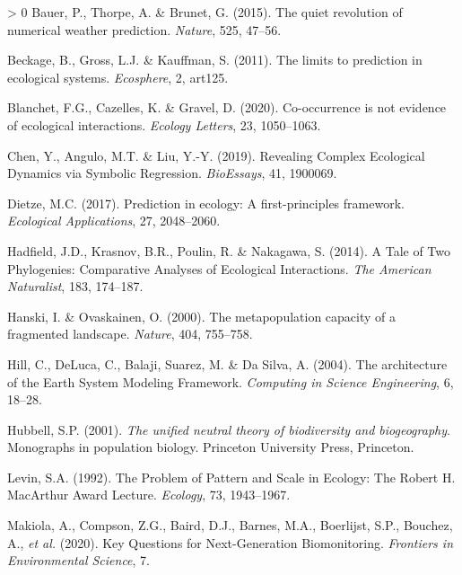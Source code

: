 \documentclass[11pt]{article}
\newlength{\cslhangindent}
\newenvironment{CSLReferences}[3] %
 {%
  \setlength{\parindent}{0pt}
  \ifodd #1 \everypar{\setlength{\hangindent}{\cslhangindent}}\ignorespaces\fi
  \ifnum #2 > 0
  \setlength{\parskip}{#2\baselineskip}
  \fi
 }%
 {}
\begin{document}
\hypertarget{refs}{}
\begin{CSLReferences}{1}{0}
\leavevmode\hypertarget{ref-Bauer2015QuiRev}{}%
Bauer, P., Thorpe, A. \& Brunet, G. (2015). The quiet revolution of
numerical weather prediction. \emph{Nature}, 525, 47--56.

\leavevmode\hypertarget{ref-Beckage2011LimPre}{}%
Beckage, B., Gross, L.J. \& Kauffman, S. (2011). The limits to
prediction in ecological systems. \emph{Ecosphere}, 2, art125.

\leavevmode\hypertarget{ref-Blanchet2020CooNot}{}%
Blanchet, F.G., Cazelles, K. \& Gravel, D. (2020). Co-occurrence is not
evidence of ecological interactions. \emph{Ecology Letters}, 23,
1050--1063.

\leavevmode\hypertarget{ref-Chen2019RevCom}{}%
Chen, Y., Angulo, M.T. \& Liu, Y.-Y. (2019). Revealing Complex
Ecological Dynamics via Symbolic Regression. \emph{BioEssays}, 41,
1900069.

\leavevmode\hypertarget{ref-Dietze2017PreEco}{}%
Dietze, M.C. (2017). Prediction in ecology: A first-principles
framework. \emph{Ecological Applications}, 27, 2048--2060.

\leavevmode\hypertarget{ref-Hadfield2014TalTwo}{}%
Hadfield, J.D., Krasnov, B.R., Poulin, R. \& Nakagawa, S. (2014). A Tale
of Two Phylogenies: Comparative Analyses of Ecological Interactions.
\emph{The American Naturalist}, 183, 174--187.

\leavevmode\hypertarget{ref-Hanski2000MetCap}{}%
Hanski, I. \& Ovaskainen, O. (2000). The metapopulation capacity of a
fragmented landscape. \emph{Nature}, 404, 755--758.

\leavevmode\hypertarget{ref-Hill2004ArcEar}{}%
Hill, C., DeLuca, C., Balaji, Suarez, M. \& Da Silva, A. (2004). The
architecture of the Earth System Modeling Framework. \emph{Computing in
Science Engineering}, 6, 18--28.

\leavevmode\hypertarget{ref-Hubbell2001UniNeu}{}%
Hubbell, S.P. (2001). \emph{The unified neutral theory of biodiversity
and biogeography}. Monographs in population biology. Princeton
University Press, Princeton.

\leavevmode\hypertarget{ref-Levin1992ProPat}{}%
Levin, S.A. (1992). The Problem of Pattern and Scale in Ecology: The
Robert H. MacArthur Award Lecture. \emph{Ecology}, 73, 1943--1967.

\leavevmode\hypertarget{ref-Makiola2020KeyQue}{}%
Makiola, A., Compson, Z.G., Baird, D.J., Barnes, M.A., Boerlijst, S.P.,
Bouchez, A., \emph{et al.} (2020). Key Questions for Next-Generation
Biomonitoring. \emph{Frontiers in Environmental Science}, 7.


\end{CSLReferences}
\end{document}
